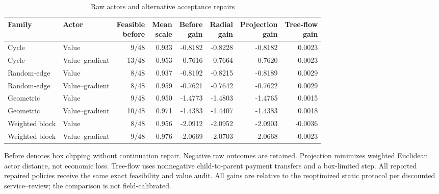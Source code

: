 \begin{table}[p]\centering
\caption{Raw actors and alternative acceptance repairs}\label{tab:r12-repair}
\setlength{\tabcolsep}{3.5pt}\begin{tabular}{llrrrrrr}
\toprule
Family & Actor & \shortstack{Feasible\\before} & \shortstack{Mean\\scale} & \shortstack{Before\\gain} & \shortstack{Radial\\gain} & \shortstack{Projection\\gain} & \shortstack{Tree-flow\\gain} \\
\midrule
Cycle & Value & 9/48 & 0.933 & -0.8182 & -0.8228 & -0.8182 & 0.0023 \\
Cycle & Value--gradient & 13/48 & 0.953 & -0.7616 & -0.7664 & -0.7620 & 0.0023 \\
Random-edge & Value & 8/48 & 0.937 & -0.8192 & -0.8215 & -0.8189 & 0.0029 \\
Random-edge & Value--gradient & 8/48 & 0.959 & -0.7621 & -0.7642 & -0.7622 & 0.0029 \\
Geometric & Value & 9/48 & 0.950 & -1.4773 & -1.4803 & -1.4765 & 0.0015 \\
Geometric & Value--gradient & 10/48 & 0.971 & -1.4383 & -1.4407 & -1.4383 & 0.0018 \\
Weighted block & Value & 8/48 & 0.956 & -2.0912 & -2.0952 & -2.0903 & -0.0036 \\
Weighted block & Value--gradient & 9/48 & 0.976 & -2.0669 & -2.0703 & -2.0668 & -0.0023 \\
\bottomrule
\end{tabular}
\begin{minipage}{.98\textwidth}\small
Before denotes box clipping without continuation repair. Negative raw outcomes are retained. Projection minimizes weighted Euclidean actor distance, not economic loss. Tree-flow uses nonnegative child-to-parent payment transfers and a box-limited step. All reported repaired policies receive the same exact feasibility and value audit. All gains are relative to the reoptimized static protocol per discounted service--review; the comparison is not field-calibrated.
\end{minipage}
\end{table}
